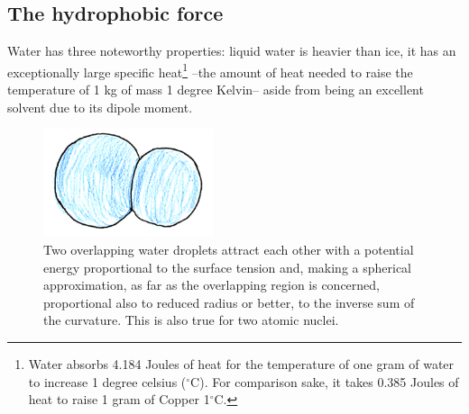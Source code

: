 \begin{subappendices}
\subsection{The hydrophobic force}
Water has three noteworthy properties: liquid water is heavier than ice, it has an exceptionally large specific heat\footnote{Water absorbs 4.184 Joules of heat for the temperature of one gram of water to increase 1 degree celsius ($^\circ$C). For comparison sake, it takes 0.385 Joules of heat to raise 1 gram of Copper 1$^\circ$C.} --the amount of heat needed to raise the temperature of 1 kg of mass 1 degree Kelvin-- aside from being an excellent solvent due to its dipole moment.
\begin{figure}
\centerline{\includegraphics[width=5cm]{C8/figsC8/fig6G4.pdf}}
\caption{Two overlapping water droplets attract each other with a potential energy proportional to the surface
tension and, making a spherical approximation, as far as the overlapping region is concerned, proportional
also to reduced radius or better, to the inverse sum of the curvature. This is also true for two atomic nuclei.}\label{fig6G4}
\end{figure}


\end{subappendices}
